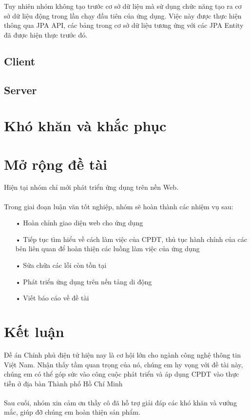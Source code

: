 \documentclass[a4paper]{article}
\begin{document}
Tuy nhiên nhóm không tạo trước cơ sở dữ liệu mà sử dụng chức năng tạo ra cơ sở dữ liệu động trong lần chạy đầu tiên của ứng dụng. Việc này được thực hiện thông qua JPA API, các bảng trong cơ sở dữ liệu tương ứng với các JPA Entity đã được hiện thực trước đó.
\subsection{Client}

\subsection{Server}

\section{Khó khăn và khắc phục}

\section{Mở rộng đề tài}
Hiện tại nhóm chỉ mới phát triển ứng dụng trên nền Web. \\ 
\\
Trong giai đoạn luận văn tốt nghiệp, nhóm sẽ hoàn thành các nhiệm vụ sau:
\begin{itemize}
	\item[•]Hoàn chỉnh giao diện web cho ứng dụng
	\item[•]Tiếp tục tìm hiểu về cách làm việc của CPĐT, thủ tục hành chính của các bên liên quan để hoàn thiện các luồng làm việc của ứng dụng
	\item[•]Sửa chữa các lỗi còn tồn tại
	\item[•]Phát triển ứng dụng trên nền tảng di động
	\item[•]Viết báo cáo về đề tài
\end{itemize}
\section{Kết luận}
Đề án Chính phủ điện tử hiện nay là cơ hội lớn cho ngành công nghệ thông tin Việt Nam. Nhận thấy tầm quan trọng của nó, chúng em hy vọng với đề tài này, chúng em có thể góp sức vào công cuộc phát triển và áp dụng CPĐT vào thực tiễn ở địa bàn Thành phố Hồ Chí Minh \\
\\
Sau cuối, nhóm xin cảm ơn thầy cô đã hỗ trợ giải đáp các khó khăn và vướng mắc, giúp đỡ chúng em hoàn thiện sản phẩm.
\newpage
\end{document}
